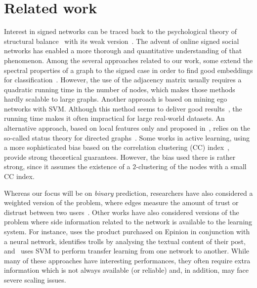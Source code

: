\section{Related work}

Interest in signed networks can be traced back to the psychological theory of structural
balance~\autocites{Cartwright56}{HeiderBook58} with its weak
version~\autocite{davis1967clustering}.  The advent of online signed social networks has enabled a
more thorough and quantitative understanding of that phenomenon. Among the several approaches
related to our work, some extend the spectral properties of a graph to the signed case in order to
find good embeddings for classification~\autocites{Kunegis2009}{SignedEmbedding15}. However, the
use of the adjacency matrix usually requires a quadratic running time in the number of nodes, which
makes those methods hardly scalable to large graphs. Another approach is based on mining ego
networks with SVM. Although this method seems to deliver good results~\autocite{Papaoikonomou2014},
the running time makes it often impractical for large real-world datasets. An alternative approach,
based on local features only and proposed in~\autocite{Leskovec2010}, relies on the so-called
status theory for directed graphs~\autocite{guha2004propagation}. Some works in active learning,
using a more sophisticated bias based on the correlation clustering (CC)
index~\autocites{Cesa-Bianchi2012a}{Cesa-Bianchi2012b}, provide strong theoretical guarantees.
However, the bias used there is rather strong, since it assumes the existence of a $2$-clustering
of the nodes with a small CC index.

Whereas our focus will be on \emph{binary} prediction, researchers have also considered a weighted
version of the problem, where edges measure the amount of trust or distrust between two
users~\autocites{guha2004propagation}{Tang2013}{Bachi2012}{Qian2014sn}. Other works have also
considered versions of the problem where side information related to the network is available to
the learning system. For instance, \autocite{EdgeSignsRating15} uses the product purchased on
Epinion in conjunction with a neural network, \autocite{TrollDetection15} identifies trolls by
analysing the textual content of their post, and~\autocite{SNTransfer13} uses SVM to perform
transfer learning from one network to another. While many of these approaches have interesting
performances, they often require extra information which is not always available (or reliable) and,
in addition, may face severe scaling issues.

